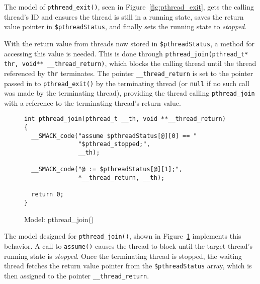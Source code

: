 The model of \lstinline|pthread_exit()|, seen in
Figure~\ref{fig:pthread_exit}, gets the calling thread's ID and
ensures the thread is still in a running state, saves the return value
pointer in \lstinline|$pthreadStatus|, and finally sets the running
state to \emph{stopped}.

With the return value from threads now stored in
\lstinline|$pthreadStatus|, a method for accessing this value is
needed.  This is done through 
\lstinline[breaklines]|pthread_join(pthread_t* thr, void** __thread_return)|,
which blocks the calling thread until the thread referenced by 
\lstinline|thr| terminates. The pointer \lstinline|__thread_return| is
set to the pointer passed in to \lstinline|pthread_exit()| by the
terminating thread (or \lstinline|null| if no such call was made by
the terminating thread), providing the thread calling
\lstinline|pthread_join| with a reference to the terminating thread's
return value.

\begin{figure}[!ht]
\centering
\begin{lstlisting}
int pthread_join(pthread_t __th, void **__thread_return)
{
  __SMACK_code("assume $pthreadStatus[@][0] == "
               "$pthread_stopped;",
               __th);

  __SMACK_code("@ := $pthreadStatus[@][1];",
               *__thread_return, __th);

  return 0;
}
\end{lstlisting}
\caption{Model: pthread\_join()}\label{fig:pthread_join}
\end{figure}

The model designed for \lstinline|pthread_join()|, shown in
Figure~\ref{fig:pthread_join} implements this behavior.  A call to
\lstinline|assume()| causes the thread to block until the target
thread's running state is \emph{stopped}.  Once the terminating thread
is stopped, the waiting thread fetches the return value pointer from
the \lstinline|$pthreadStatus| array, which is then assigned to the
pointer \lstinline|__thread_return|.



